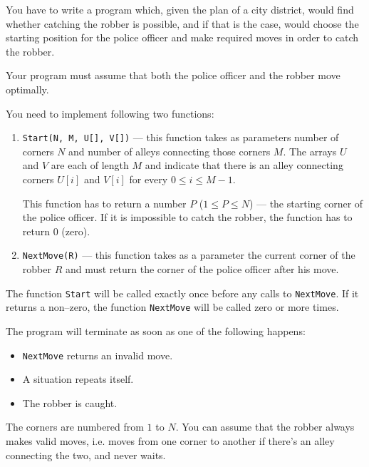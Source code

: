 \documentclass{boi2014}
\newcommand{\method}[1]{{\tt #1}}
\begin{document}
    \Task
    You have to write a program which, given the plan of a city district, would
    find whether catching the robber is possible, and if that is the case, would
    choose the starting position for the police officer and make required moves
    in order to catch the robber.
    
    Your program must assume that both the police officer and the robber move
    optimally.

    \Implementation
    You need to implement following two functions:
    \begin{enumerate}
        \item \method{Start(N, M, U[], V[])} --- this function takes as
        parameters number of corners $N$ and number of alleys connecting those
        corners $M$. The arrays $U$ and $V$ are each of length $M$ and indicate
        that there is an alley connecting corners $U[i]$ and $V[i]$ for every $0
        \le i \le M - 1$.

        This function has to return a number $P$ ($1 \le P \le N$) --- the
        starting corner of the police officer. If it is impossible to catch the
        robber, the function has to return 0 (zero).

        \item \method{NextMove(R)} --- this function takes as a parameter the
        current corner of the robber $R$ and must return the corner of the
        police officer after his move.
    \end{enumerate}

    The function \method{Start} will be called exactly once before any
    calls to \method{NextMove}. If it returns a non--zero, the function
    \method{NextMove} will be called zero or more times.

    The program will terminate as soon as one of the following happens:
    \begin{itemize}
        \item \method{NextMove} returns an invalid move.
        \item A situation repeats itself.
        \item The robber is caught.
    \end{itemize}

    The corners are numbered from $1$ to $N$. You can assume that the robber
    always makes valid moves, i.e. moves from one corner to another if there's
    an alley connecting the two, and never waits.

    \Example
\end{document}
